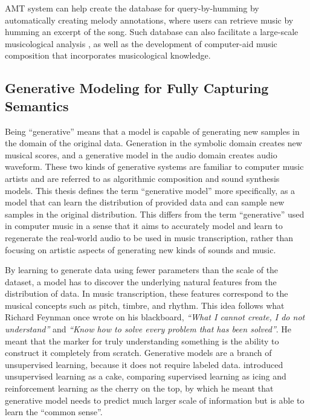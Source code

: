 AMT system can help create the database for query-by-humming \cite{ghias1995humming} by automatically creating melody annotations, where users can retrieve music by humming an excerpt of the song.
Such database can also facilitate a large-scale musicological analysis \cite{abdallah2015british}, as well as the development of computer-aid music composition \cite{agostini2013aid} that incorporates musicological knowledge.


\subsection{Generative Modeling for Fully Capturing Semantics}

Being ``generative'' means that a model is capable of generating new samples in the domain of the original data.
Generation in the symbolic domain creates new musical scores, and a generative model in the audio domain creates audio waveform.
These two kinds of generative systems are familiar to computer music artists and are referred to as algorithmic composition \cite{fernandez2013ai} and sound synthesis \cite{cook2002synthesis} models.
This thesis defines the term ``generative model'' more specifically, as a model that can learn the distribution of provided data and can sample new samples in the original distribution.
This differs from the term ``generative'' used in computer music in a sense that it aims to accurately model and learn to regenerate the real-world audio to be used in music transcription, rather than focusing on artistic aspects of generating new kinds of sounds and music.

By learning to generate data using fewer parameters than the scale of the dataset, a model has to discover the underlying natural features from the distribution of data.
In music transcription, these features correspond to the musical concepts such as pitch, timbre, and rhythm.
This idea follows what Richard Feynman once wrote on his blackboard, \emph{``What I cannot create, I do not understand''} and \emph{``Know how to solve every problem that has been solved''}.
He meant that the marker for truly understanding something is the ability to construct it completely from scratch.
Generative models are a branch of unsupervised learning, because it does not require labeled data.
 introduced unsupervised learning as a cake, comparing supervised learning as icing and reinforcement learning as the cherry on the top, by which he meant that generative model needs to predict much larger scale of information but is able to learn the ``common sense''.

